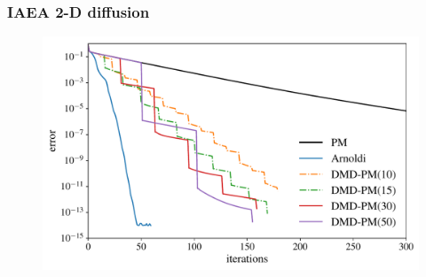 \documentclass[fleqn]{beamer}
\begin{document}
\begin{frame}
\frametitle{IAEA 2-D diffusion}
\begin{figure}
\centering
\includegraphics[width =\textwidth]{figures/dmdpi_semilog.pdf}
\end{figure}
\end{frame}
\end{document}
